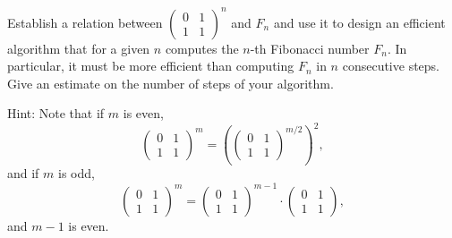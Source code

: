 \begin{exercise}
\label{applied:2013:6}

Establish a relation between $\begin{pmatrix}0&1\\1&1\end{pmatrix}^{n}$ and $F_{n}$ and use it to design an efficient algorithm that for a given $n$ computes the $n$-th Fibonacci number $F_{n}$. In particular, it must be more efficient than computing $F_{n}$ in $n$ consecutive steps. Give an estimate on the number of steps of your algorithm.

Hint: Note that if $m$ is even,
\[
\begin{pmatrix}0&1\\1&1\end{pmatrix}^{m}=\left(\begin{pmatrix}0&1\\1&1\end{pmatrix}^{m/2}\right)^{2},
\]
and if $m$ is odd,
\[
\begin{pmatrix}0&1\\1&1\end{pmatrix}^{m}=\begin{pmatrix}0&1\\1&1\end{pmatrix}^{m-1}\cdot\begin{pmatrix}0&1\\1&1\end{pmatrix},
\]
and $m-1$ is even.
\end{exercise}

